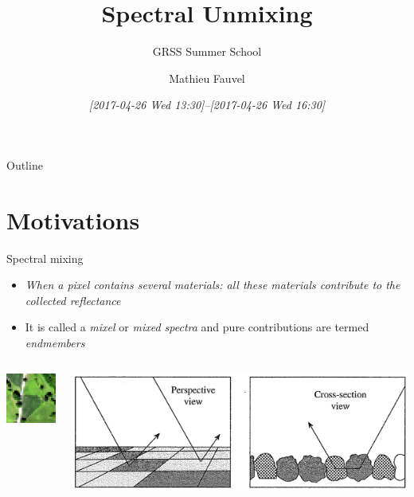 \documentclass[10pt,aspectratio=1610]{beamer}
\author{Mathieu Fauvel}
\date{\textit{[2017-04-26 Wed 13:30]--[2017-04-26 Wed 16:30]}}
\title{Spectral Unmixing}
\subtitle{GRSS Summer School}
\institute{UMR Dynafor}
\begin{document}
\maketitle
\begin{frame}{Outline}
\tableofcontents
\end{frame}

\section{Motivations}
\label{sec:org86fce82}
\begin{frame}[label={sec:orgca694d7}]{Spectral mixing}
\begin{itemize}
\item \emph{When a pixel contains several materials: all these materials contribute to the collected reflectance}~\cite{manolakis2016hyperspectral}
\item It is called a \emph{mixel} or \emph{mixed spectra} and pure contributions are termed \emph{endmembers}
\end{itemize}
\begin{columns}
\begin{column}{0.3\columnwidth}
\begin{center}
\includegraphics[trim=1cm 2cm 2cm 1cm,clip=true,width=4cm]{./figures/46_8.jpg}
\end{center}
\end{column}
\begin{column}{0.7\columnwidth}
\begin{center}
\includegraphics[width=\textwidth]{./figures/mixing_process.png}
\end{center}
\end{column}
\end{columns}
\end{frame}
\end{document}
